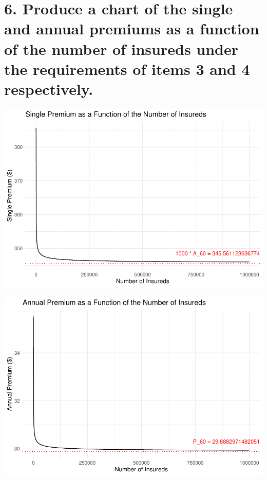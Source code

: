 \documentclass[
]{article}
\begin{document}
\hypertarget{produce-a-chart-of-the-single-and-annual-premiums-as-a-function-of-the-number-of-insureds-under-the-requirements-of-items-3-and-4-respectively.}{%
\section{6. Produce a chart of the single and annual premiums as a
function of the number of insureds under the requirements of items 3 and
4
respectively.}\label{produce-a-chart-of-the-single-and-annual-premiums-as-a-function-of-the-number-of-insureds-under-the-requirements-of-items-3-and-4-respectively.}}

\includegraphics{Zejie--Sandy--Gao-172A-final-project_files/figure-latex/unnamed-chunk-10-1.pdf}

\includegraphics{Zejie--Sandy--Gao-172A-final-project_files/figure-latex/unnamed-chunk-11-1.pdf}
\end{document}
